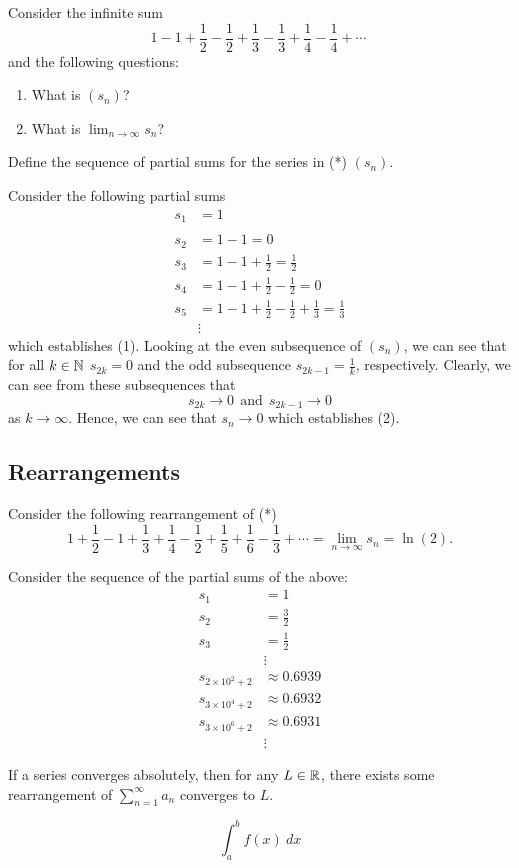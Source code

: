 \documentclass[a4paper]{article}
\begin{document}
Consider the infinite sum
\[  1 - 1 + \frac{ 1 }{ 2 }  - \frac{ 1 }{ 2 }  + \frac{ 1 }{ 3 }  - \frac{ 1 }{ 3 }  + \frac{ 1 }{ 4 }  - \frac{ 1 }{ 4 }  + \cdots \   \tag{*}\]
and the following questions:
\begin{enumerate}
    \item[(1)] What is \( ({s}_{n}) \)?
    \item[(2)] What is \( \lim_{ n \to \infty  }  {s}_{n} \)?
\end{enumerate}
Define the sequence of partial sums for the series in (*) \( ({s}_{n}) \).

Consider the following partial sums 
\begin{align*}
    {s}_{1} &= 1 \\ \\
    {s}_{2} &= 1 - 1 = 0 \\
    {s}_{3} &= 1 - 1 + \frac{ 1 }{ 2 }  = \frac{ 1 }{ 2 }  \\
    {s}_{4} &= 1 - 1 + \frac{ 1 }{ 2 }  - \frac{ 1 }{ 2 } = 0  \\
    {s}_{5} &= 1 - 1 + \frac{ 1 }{ 2 }  - \frac{ 1 }{ 2 }  + \frac{ 1 }{ 3 }  = \frac{ 1 }{ 3 }  \\
            &\vdots 
\end{align*}
which establishes (1). Looking at the even subsequence of \( ({s}_{n}) \), we can see that for all \( k \in \mathbb{N}  \) \( {s}_{2k} = 0 \) and the odd subsequence \( {s}_{2k-1} = \frac{ 1 }{ k }  \), respectively. Clearly, we can see from these subsequences that  
\[  {s}_{2k} \to 0 \ \ \text{and} \ \ {s}_{2k-1} \to 0 \]
as \( k \to \infty  \). Hence, we can see that \( {s}_{n} \to 0  \) which establishes (2). 

\subsection{Rearrangements}

Consider the following rearrangement of (*)
\[  1 + \frac{ 1 }{ 2 }  - 1 + \frac{ 1 }{ 3 } + \frac{ 1 }{ 4 }  - \frac{ 1 }{ 2 }  + \frac{ 1 }{ 5 }  + \frac{ 1 }{ 6 }  - \frac{ 1 }{ 3 }  + \cdots = \lim_{ n \to \infty   } {s}_{n} = \ln (2).  \]

Consider the sequence of the partial sums of the above: 
\begin{align*}
    {s}_{1} &= 1  \\
    {s}_{2} &= \frac{ 3 }{ 2 }  \\
    {s}_{3} &= \frac{ 1 }{ 2 }  \\
            &\vdots \\
    {s}_{2 \times 10^{2} + 2} &\approx 0.6939 \\
    {s}_{3 \times 10^{4} + 2} &\approx 0.6932 \\
    {s}_{3 \times 10^{6} + 2} &\approx 0.6931 \\
            &\vdots 
\end{align*} 

\begin{theorem}[ ]
    If a series converges absolutely, then for any \( L \in \mathbb{R}  \), there exists some rearrangement of \( \sum_{ n=1  }^{ \infty  } {a}_{n} \) converges to \( L  \).
\end{theorem}

\[  \int_{ a }^{ b } f(x) \ dx \]
\end{document}
